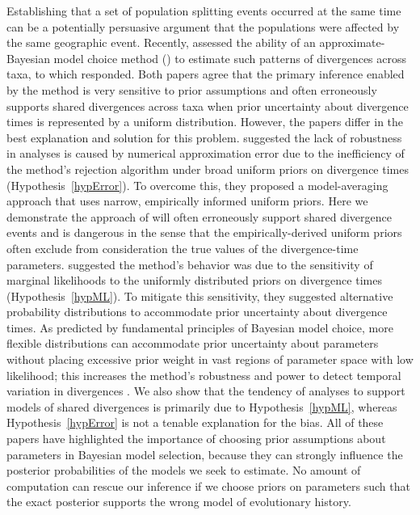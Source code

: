 Establishing that a set of population splitting events occurred at the same
time can be a potentially persuasive argument that the populations were
affected by the same geographic event.
Recently, \citet{Oaks2012} assessed the ability of an approximate-Bayesian
model choice method (\msb) to estimate such patterns of divergences across
taxa, to which \citet{Hickerson2013} responded.
Both papers agree that the primary inference enabled by the method is very
sensitive to prior assumptions and often erroneously supports shared
divergences across taxa when prior uncertainty about divergence times
is represented by a uniform distribution.
However, the papers differ in the best explanation and solution for this
problem.
\citet{Hickerson2013} suggested the lack of robustness in \msb analyses is
caused by numerical approximation error due to the inefficiency of the method's
rejection algorithm under broad uniform priors on divergence times
(Hypothesis~\ref{hypError}).
To overcome this, they proposed a model-averaging approach that uses narrow,
empirically informed uniform priors.
Here we demonstrate the approach of \citet{Hickerson2013} will often
erroneously support shared divergence events and is dangerous in the sense that
the empirically-derived uniform priors often exclude from consideration the
true values of the divergence-time parameters.
\citet{Oaks2012} suggested the method's behavior was due to the sensitivity of
marginal likelihoods to the uniformly distributed priors on divergence times
(Hypothesis~\ref{hypML}).
To mitigate this sensitivity, they suggested alternative probability
distributions to accommodate prior uncertainty about divergence times.
As predicted by fundamental principles of Bayesian model choice, more flexible
distributions can accommodate prior uncertainty about parameters without
placing excessive prior weight in vast regions of parameter space with low
likelihood;
this increases the method's robustness and power to detect temporal variation
in divergences \citep{Oaks2014dpp}.
We also show that the tendency of \msb analyses to support models of shared
divergences is primarily due to Hypothesis~\ref{hypML}, whereas
Hypothesis~\ref{hypError} is not a tenable explanation for the bias.
All of these papers have highlighted the importance of choosing prior
assumptions about parameters in Bayesian model selection, because they can
strongly influence the posterior probabilities of the models we seek to
estimate.
No amount of computation can rescue our inference if we choose priors on
parameters such that the exact posterior supports the wrong model of
evolutionary history.
